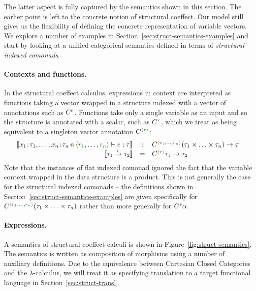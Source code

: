 The latter aspect is fully captured by the semantics shown in this section. The
earlier point is left to the concrete notion of structural coeffect. Our model still gives
us the flexibility of defining the concrete representation of variable vectors. We explore
a number of examples in Section~\ref{sec:struct-semantics-examples} and start by looking
at a unified categorical semantics defined in terms of \emph{structural indexed comonads}.

\paragraph{Contexts and functions.}
In the structural coeffect calculus, expressions in context are interpreted as functions taking
a vector wrapped in a structure indexed with a vector of annotations
such as $\ctyp{\aclrd{\textbf{r}}}$. Functions take only a single variable as an input and so the
structure is annotated with a scalar, such as $\ctyp{\cclrd{r}}$, which we treat as being equivalent
to a singleton vector annotation $\ctyp{\alift{\cclrd{r}}}$:
%
\begin{equation*}
\begin{array}{rcl}
\sem{\coctx{x_1\!:\!\tau_1, \ldots, x_n\!:\!\tau_n}{ \alift{\cclrd{r_1}, \ldots, \cclrd{r_n}} } \vdash e : \tau}
  &:& \ctyp{ \alift{\cclrd{r_1}, \ldots, \cclrd{r_n}} }{(\tau_1 \times \ldots \times \tau_n)} \rightarrow \tau\\
\sem{\tau_1 \xrightarrow{\cclrd{r}} \tau_2} &=& \ctyp{\alift{\cclrd{r}}}{\tau_1} \rightarrow \tau_2
\end{array}
\end{equation*}
%
Note that the instances of flat indexed comonad ignored the fact that the variable
context wrapped in the data structure is a product. This is not generally the case for the
structural indexed comonads -- the definitions shown in Section~\ref{sec:struct-semantics-examples}
are given specifically for $\ctyp{ \alift{\cclrd{r_1}, \ldots, \cclrd{r_n}} }{(\tau_1 \times \ldots \times \tau_n)}$
rather than more generally for $\ctyp{\aclrd{\textbf{r}}}{\alpha}$. 

\paragraph{Expressions.}
A semantics of structural coeffect calculi is shown in Figure~\ref{fig:struct-semantics}. The
semantics is written as composition of morphisms using a number of auxiliary definitions. Due to
the equivalence between Cartesian Closed Categories and the $\lambda$-calculus, we will treat it
as specifying translation to a target functional language in Section~\ref{sec:struct-transl}.

